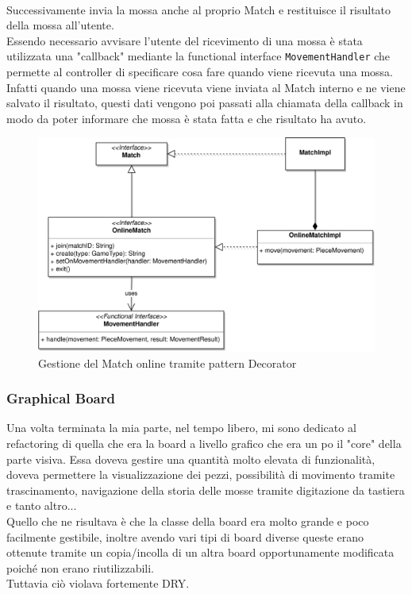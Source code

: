 \documentclass[a4paper,12pt]{report}
\begin{document}
\\
Successivamente invia la mossa anche al proprio Match e restituisce il risultato della mossa all'utente.
\\
Essendo necessario avvisare l'utente del ricevimento di una mossa è stata utilizzata una "callback" mediante la functional interface \texttt{MovementHandler} che permette al controller di specificare cosa fare quando viene ricevuta una mossa.
Infatti quando una mossa viene ricevuta viene inviata al Match interno e ne viene salvato il risultato, questi dati vengono poi passati alla chiamata della callback in modo da poter informare che mossa è stata fatta e che risultato ha avuto.
%
\begin{figure}[H]
    \begin{center}
        \centering
        \includegraphics[width=\textwidth]{img/Alessandro/online_match.png}
    \end{center}
    \caption{Gestione del Match online tramite pattern Decorator}
    \label{img:online_match}
\end{figure}

\subsubsection{Graphical Board}
Una volta terminata la mia parte, nel tempo libero, mi sono dedicato al refactoring di quella che era la board a livello grafico che era un po il "core" della parte visiva.
Essa doveva gestire una quantità molto elevata di funzionalità, doveva permettere la visualizzazione dei pezzi, possibilità di movimento tramite trascinamento, navigazione della storia delle mosse tramite digitazione da tastiera e tanto altro...
\\
Quello che ne risultava è che la classe della board era molto grande e poco facilmente gestibile, inoltre avendo vari tipi di board diverse queste erano ottenute tramite un copia/incolla di un altra board opportunamente modificata poiché non erano riutilizzabili.
\\
Tuttavia ciò violava fortemente DRY.
\end{document}
